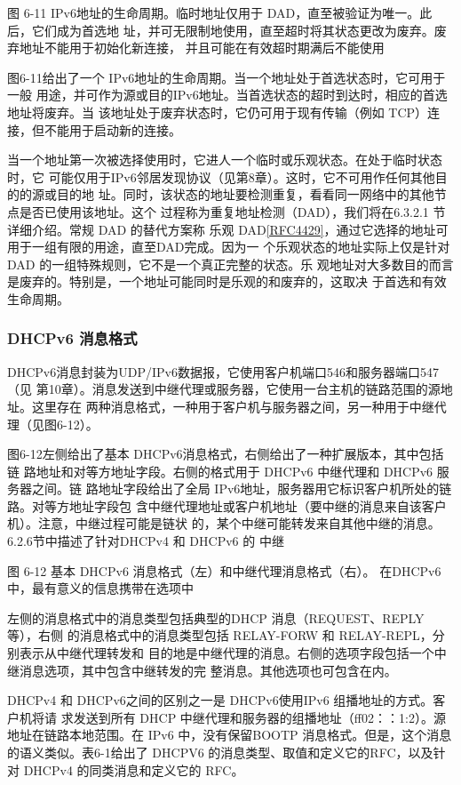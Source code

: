 图 6-11
IPv6地址的生命周期。临时地址仅用于 DAD，直至被验证为唯一。此后，它们成为首选地
址，并可无限制地使用，直至超时将其状态更改为废弃。废弃地址不能用于初始化新连接，
并且可能在有效超时期满后不能使用

图6-11给出了一个 IPv6地址的生命周期。当一个地址处于首选状态时，它可用于一般
用途，并可作为源或目的IPv6地址。当首选状态的超时到达时，相应的首选地址将废弃。当
该地址处于废弃状态时，它仍可用于现有传输（例如 TCP）连接，但不能用于启动新的连接。

当一个地址第一次被选择使用时，它进人一个临时或乐观状态。在处于临时状态时，它
可能仅用于IPv6邻居发现协议（见第8章）。这时，它不可用作任何其他目的的源或目的地
址。同时，该状态的地址要检测重复，看看同一网络中的其他节点是否已使用该地址。这个
过程称为重复地址检测（DAD），我们将在6.3.2.1 节详细介绍。常规 DAD 的替代方案称
乐观
DAD\href{https://www.rfc-editor.org/rfc/rfc4429}{\href{https://www.rfc-editor.org/rfc/rfc4429}{[RFC4429]}}，通过它选择的地址可用于一组有限的用途，直至DAD完成。因为一
个乐观状态的地址实际上仅是针对 DAD 的一组特殊规则，它不是一个真正完整的状态。乐
观地址对大多数目的而言是废弃的。特别是，一个地址可能同时是乐观的和废弃的，这取决
于首选和有效生命周期。

\subsubsection{DHCPv6 消息格式}
DHCPv6消息封装为UDP/IPv6数据报，它使用客户机端口546和服务器端口547（见
第10章）。消息发送到中继代理或服务器，它使用一台主机的链路范围的源地址。这里存在
两种消息格式，一种用于客户机与服务器之间，另一种用于中继代理（见图6-12）。

图6-12左侧给出了基本 DHCPv6消息格式，右侧给出了一种扩展版本，其中包括链
路地址和对等方地址字段。右侧的格式用于 DHCPv6 中继代理和 DHCPv6 服务器之间。链
路地址字段给出了全局 IPv6地址，服务器用它标识客户机所处的链路。对等方地址字段包
含中继代理地址或客户机地址（要中继的消息来自该客户机）。注意，中继过程可能是链状
的，某个中继可能转发来自其他中继的消息。6.2.6节中描述了针对DHCPv4 和 DHCPv6 的
中继

图 6-12
基本 DHCPv6 消息格式（左）和中继代理消息格式（右）。
在DHCPv6中，最有意义的信息携带在选项中

左侧的消息格式中的消息类型包括典型的DHCP 消息（REQUEST、REPLY 等），右侧
的消息格式中的消息类型包括 RELAY-FORW 和 RELAY-REPL，分别表示从中继代理转发和
目的地是中继代理的消息。右侧的选项字段包括一个中继消息选项，其中包含中继转发的完
整消息。其他选项也可包含在内。

DHCPv4 和 DHCPv6之间的区别之一是 DHCPv6使用IPv6 组播地址的方式。客户机将请
求发送到所有 DHCP 中继代理和服务器的组播地址（ff02：：1:2）。源地址在链路本地范围。在
IPv6 中，没有保留BOOTP 消息格式。但是，这个消息的语义类似。表6-1给出了 DHCPV6
的消息类型、取值和定义它的RFC，以及针对 DHCPv4 的同类消息和定义它的 RFC。

